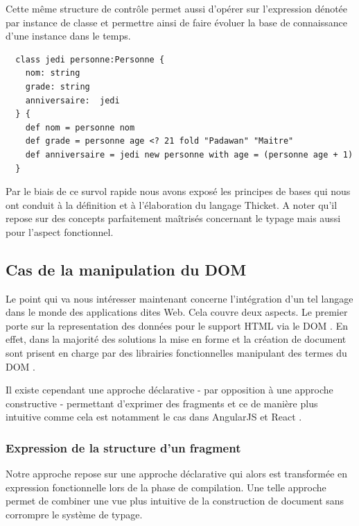 \documentclass[twoside,a4paper]{article}
\begin{document}
Cette   même  structure   de  contrôle   permet  aussi   d'opérer  sur
l'expression  dénotée par  instance de  classe et  permettre ainsi  de
faire évoluer la base de connaissance d'une instance dans le temps.

\lstset{language=Thicket}
\begin{lstlisting}
  class jedi personne:Personne {
    nom: string
    grade: string
    anniversaire:  jedi
  } {
    def nom = personne nom
    def grade = personne age <? 21 fold "Padawan" "Maitre"
    def anniversaire = jedi new personne with age = (personne age + 1)
  }
\end{lstlisting}

Par le  biais de ce survol  rapide nous avons exposé  les principes de
bases  qui nous  ont conduit  à la  définition et  à l'élaboration  du
langage Thicket.  A  noter qu'il repose sur  des concepts parfaitement
maîtrisés concernant le typage mais aussi pour l'aspect fonctionnel.

\subsection{Cas de la manipulation du DOM}

Le point qui va nous intéresser maintenant concerne l'intégration d'un
tel langage  dans le  monde des applications  dites Web.   Cela couvre
deux aspects. Le premier porte  sur la representation des données pour
le support HTML via le DOM  \cite{dom}. En effet, dans la majorité des
solutions la mise en forme et  la création de document sont prisent en
charge par des librairies fonctionnelles  manipulant des termes du DOM
\cite{dom}.

Il existe  cependant une approche  déclarative - par opposition  à une
approche constructive -  permettant d'exprimer des fragments  et ce de
manière plus intuitive comme cela  est notamment le cas dans AngularJS
\cite{angularjs} et React \cite{react}.

\subsubsection{Expression de la structure d'un fragment}

Notre  approche repose  sur  une approche  déclarative  qui alors  est
transformée  en   expression  fonctionnelle   lors  de  la   phase  de
compilation.   Une telle  approche  permet de  combiner  une vue  plus
intuitive de la construction de  document sans corrompre le système de
typage.
\end{document}
